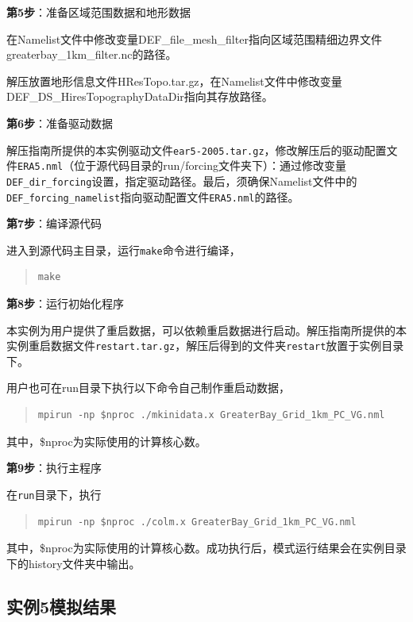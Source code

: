 \bigskip
\textbf{第5步}：准备区域范围数据和地形数据

在Namelist文件中修改变量DEF\_file\_mesh\_filter指向区域范围精细边界文件greaterbay\_1km\_filter.nc的路径。

解压放置地形信息文件HResTopo.tar.gz，在Namelist文件中修改变量DEF\_DS\_\allowbreak HiresTopographyDataDir指向其存放路径。

\bigskip
\textbf{第6步}：准备驱动数据

解压指南所提供的本实例驱动文件\texttt{ear5-2005.tar.gz}，修改解压后的驱动配置文件\texttt{ERA5.nml}（位于源代码目录的run/forcing文件夹下）：通过修改变量\texttt{DEF\_dir\_forcing}设置，指定驱动路径。最后，须确保Namelist文件中的\texttt{DEF\_forcing\_namelist}指向驱动配置文件\texttt{ERA5.nml}的路径。

\bigskip
\textbf{第7步}：编译源代码

进入到源代码主目录，运行\texttt{make}命令进行编译，
\begin{quote}
\begin{lstlisting}
make
\end{lstlisting}
\end{quote}

\bigskip
\textbf{第8步}：运行初始化程序

本实例为用户提供了重启数据，可以依赖重启数据进行启动。解压指南所提供的本实例重启数据文件\texttt{restart.tar.gz}，解压后得到的文件夹\texttt{restart}放置于实例目录下。

用户也可在run目录下执行以下命令自己制作重启动数据，
\begin{quote}
\begin{lstlisting}
mpirun -np $nproc ./mkinidata.x GreaterBay_Grid_1km_PC_VG.nml
\end{lstlisting}
\end{quote}
其中，\$nproc为实际使用的计算核心数。

\bigskip
\textbf{第9步}：执行主程序

在\texttt{run}目录下，执行
\begin{quote}
\begin{lstlisting}
mpirun -np $nproc ./colm.x GreaterBay_Grid_1km_PC_VG.nml
\end{lstlisting}
\end{quote}
其中，\$nproc为实际使用的计算核心数。成功执行后，模式运行结果会在实例目录下的history文件夹中输出。

\subsection{实例5模拟结果}

